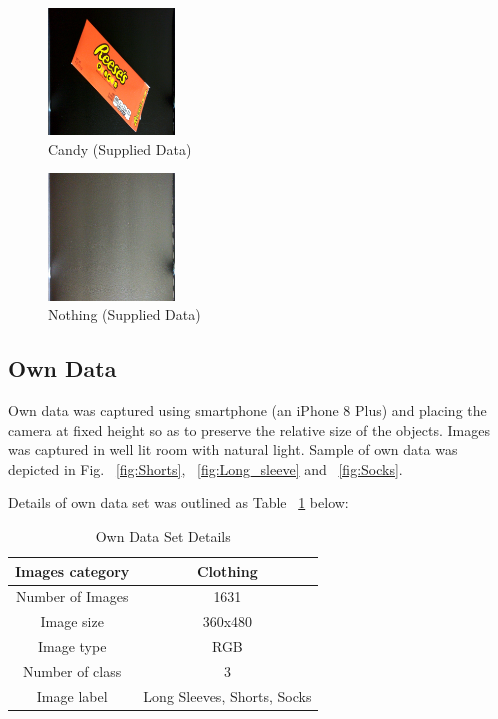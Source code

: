 \documentclass[10pt,journal,compsoc]{IEEEtran}
\begin{document}
\begin{figure}[!htbp]
      \centering
      \includegraphics[width=0.3\textwidth]{reeses}
      \caption{Candy (Supplied Data)}
      \label{fig:Candy}
\end{figure}

\begin{figure}[!htbp]
      \centering
      \includegraphics[width=0.3\textwidth]{Nothing}
      \caption{Nothing (Supplied Data)}
      \label{fig:Nothing}
\end{figure}

\subsection{Own Data}

Own data was captured using smartphone (an iPhone 8 Plus) and placing the camera at fixed height so as to preserve the relative size of the objects.  Images was captured in well lit room with natural light.  Sample of own data was depicted in Fig. ~\ref{fig:Shorts}, ~\ref{fig:Long_sleeve} and ~\ref{fig:Socks}.

Details of own data set was outlined as Table ~\ref{own data set details} below:
\begin{table}[!htbp]
\caption{Own Data Set Details}
\label{own data set details}
\begin{center}
\begin{tabular}{|c||c|}
\hline
Images category & Clothing\\
\hline
Number of Images & 1631\\
\hline
Image size & 360x480\\
\hline
Image type & RGB\\
\hline
Number of class & 3\\
\hline
Image label & Long Sleeves, Shorts, Socks\\
\hline
\end{tabular}
\end{center}
\end{table}
\end{document}
